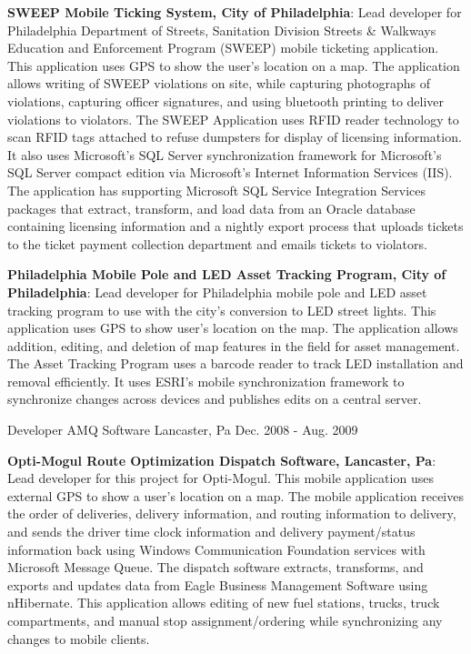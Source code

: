 \begin{cventries}
{\begin{cvitems}
        \bigskip
        \item{\textbf{SWEEP Mobile Ticking System, City of Philadelphia}: Lead developer for Philadelphia Department of Streets, Sanitation Division Streets \& Walkways Education and Enforcement Program (SWEEP) mobile ticketing application. This application uses GPS to show the user’s location on a map. The application allows writing of SWEEP violations on site, while capturing photographs of violations, capturing officer signatures, and using bluetooth printing to deliver violations to violators. The SWEEP Application uses RFID reader technology to scan RFID tags attached to refuse dumpsters for display of licensing information. It also uses Microsoft’s SQL Server synchronization framework for Microsoft’s SQL Server compact edition via Microsoft’s Internet Information Services (IIS). The application has supporting Microsoft SQL Service Integration Services packages that extract, transform, and load data from an Oracle database containing licensing information and a nightly export process that uploads tickets to the ticket payment collection department and emails tickets to violators.}
        \bigskip
        \item{\textbf{Philadelphia Mobile Pole and LED Asset Tracking Program, City of Philadelphia}: Lead developer for Philadelphia mobile pole and LED asset tracking program to use with the city’s conversion to LED street lights. This application uses GPS to show user’s location on the map. The application allows addition, editing, and deletion of map features in the field for asset management. The Asset Tracking Program uses a barcode reader to track LED installation and removal efficiently. It uses ESRI’s mobile synchronization framework to synchronize changes across devices and publishes edits on a central server.}
      \end{cvitems}
    }
  \cventry
    {Developer}
    {AMQ Software}
    {Lancaster, Pa}
    {Dec. 2008 - Aug. 2009}
    {
      \begin{cvitems}
        \item {\textbf{Opti-Mogul Route Optimization Dispatch Software, Lancaster, Pa}: Lead developer for this project for Opti-Mogul. This mobile application uses external GPS to show a user’s location on a map. The mobile application receives the order of deliveries, delivery information, and routing information to delivery, and sends the driver time clock information and delivery payment/status information back using Windows Communication Foundation services with Microsoft Message Queue. The dispatch software extracts, transforms, and exports and updates data from Eagle Business Management Software using nHibernate. This application allows editing of new fuel stations, trucks, truck compartments, and manual stop assignment/ordering while synchronizing any changes to mobile clients.}

\end{cvitems}}
\end{cventries}
